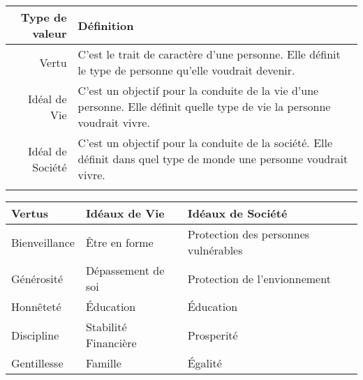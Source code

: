 \documentclass[11pt]{article}
\begin{document}
\begin{center}
\begin{tabularx}{\textwidth}{@{}rX@{}}
\hline
  \textbf{Type de valeur}
& \textbf{Définition}\\
\hline
  Vertu
& C'est le trait de caractère d'une personne. Elle définit le type de personne qu'elle voudrait devenir.\\
  Idéal de Vie
& C'est un objectif pour la conduite de la vie d'une personne. Elle définit quelle type de vie la personne voudrait vivre.\\
  Idéal de Société
& C'est un objectif pour la conduite de la société. Elle définit dans quel type de monde une personne voudrait vivre.\\
\hline\\
\end{tabularx}
\end{center}

\begin{center}
\begin{tabularx}{\textwidth}{@{}llX@{}}
\hline
  \textbf{Vertus}
& \textbf{Idéaux de Vie}
& \textbf{Idéaux de Société}\\
\hline
  Bienveillance
& Être en forme
& Protection des personnes vulnérables\\
  Générosité
& Dépassement de soi
& Protection de l'envionnement\\
  Honnêteté
& Éducation
& Éducation\\
  Discipline
& Stabilité Financière
& Prosperité\\
  Gentillesse
& Famille
& Égalité\\
\hline
\end{tabularx}
\end{center}
\end{document}
